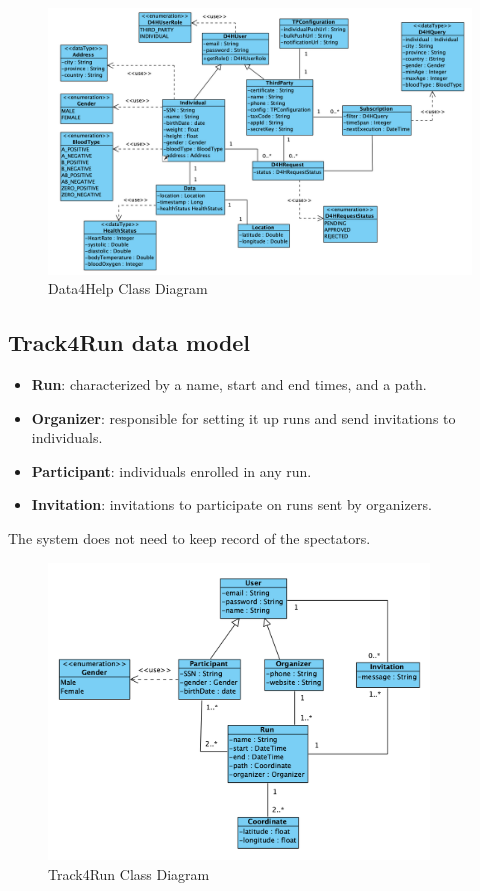 \documentclass[a4paper, hidelinks, 12pt]{report}
\begin{document}
	\begin{figure}[H]
    		\centering
		\includegraphics[width=1\textwidth]{diagrams/d4h_class_diagram.png}
		\caption[Data4Help Class Diagram]{Data4Help Class Diagram}
		\label{fig:Data4Help Class Diagram}
	\end{figure}
	
	\subsection{Track4Run data model}
	\begin{itemize}
		\item{\textbf{Run}}:  characterized by a name, start and end times, and a path.
		\item{\textbf{Organizer}}: responsible for setting it up runs and send invitations to individuals.
		\item {\textbf{Participant}}: individuals enrolled in any run.
		\item {\textbf{Invitation}}: invitations to participate on runs sent by organizers.
	\end{itemize}
	
	The system does not need to keep record of the spectators. \\
	
	\begin{figure}[H]
    		\centering
		\includegraphics[width=0.9\textwidth]{diagrams/t4r_class_diagram.png}
		\caption[Track4Run Class Diagram]{Track4Run Class Diagram}
		\label{fig:Track4Run Class Diagram}
	\end{figure}	
	
\end{document}
